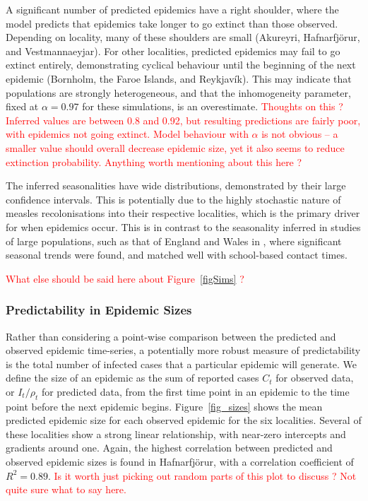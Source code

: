 \documentclass[10pt]{article}
\begin{document}
A significant number of predicted epidemics have a right shoulder, where the model predicts that epidemics take longer to go extinct than those observed. Depending on locality, many of these shoulders are small (Akureyri, Hafnarfj\"{o}r\dh{}ur, and Vestmannaeyjar). For other localities, predicted epidemics may fail to go extinct entirely, demonstrating cyclical behaviour until the beginning of the next epidemic (Bornholm, the Faroe Islands, and Reykjav\'{i}k). This may indicate that populations are strongly heterogeneous, and that the inhomogeneity parameter, fixed at $\alpha=0.97$ for these simulations, is an overestimate. \textcolor{red}{Thoughts on this ? Inferred values are between 0.8 and 0.92, but resulting predictions are fairly poor, with epidemics not going extinct. Model behaviour with $\alpha$ is not obvious -- a smaller value should overall decrease epidemic size, yet it also seems to reduce extinction probability. Anything worth mentioning about this here ?} 



The inferred seasonalities have wide distributions, demonstrated by their large confidence intervals. This is potentially due to the highly stochastic nature of measles recolonisations into their respective localities, which is the primary driver for when epidemics occur. This is in contrast to the seasonality inferred in studies of large populations, such as that of England and Wales in \cite{Finkenstadt2000}, where significant seasonal trends were found, and matched well with school-based contact times.

\textcolor{red}{What else should be said here about Figure~\ref{figSims} ?}





\subsubsection*{Predictability in Epidemic Sizes}

Rather than considering a point-wise comparison between the predicted and observed epidemic time-series, a potentially more robust measure of predictability is the total number of infected cases that a particular epidemic will generate. We define the size of an epidemic as the sum of reported cases $C_t$ for observed data, or $I_t / \rho_t$ for predicted data, from the first time point in an epidemic to the time point before the next epidemic begins. Figure~\ref{fig_sizes} shows the mean predicted epidemic size for each observed epidemic for the six localities. Several of these localities show a strong linear relationship, with near-zero intercepts and gradients around one. Again, the highest correlation between predicted and observed epidemic sizes is found in Hafnarfj\"{o}r\dh{}ur, with a correlation coefficient of $R^2 = 0.89$. \textcolor{red}{Is it worth just picking out random parts of this plot to discuss ? Not quite sure what to say here.}
\end{document}
